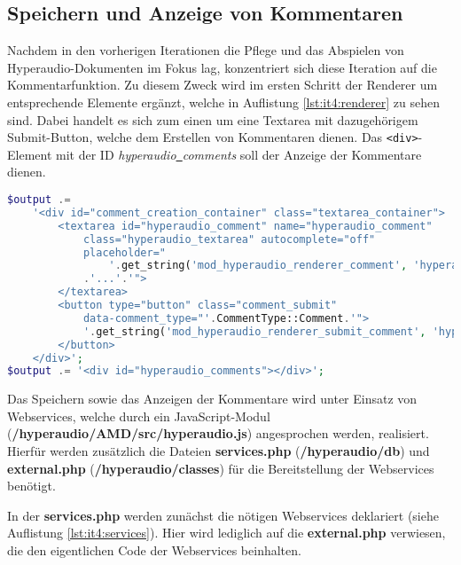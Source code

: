 \subsection{Speichern und Anzeige von Kommentaren}
\label{sub:SpeichernKommentare}
Nachdem in den vorherigen Iterationen die Pflege und das Abspielen von Hyperaudio-Dokumenten im Fokus lag, konzentriert sich diese Iteration auf die Kommentarfunktion. Zu diesem Zweck wird im ersten Schritt der Renderer um entsprechende Elemente ergänzt, welche in Auflistung \ref{lst:it4:renderer} zu sehen sind. Dabei handelt es sich zum einen um eine Textarea mit dazugehörigem Submit-Button, welche dem Erstellen von Kommentaren dienen. Das \texttt{<div>}-Element mit der ID \mbox{\textit{hyperaudio\underline{{ }}comments}} soll der Anzeige der Kommentare dienen.

\begin{lstlisting}[language=php,
             linewidth=\textwidth,
             caption={Ausschnitt der \textbf{renderer.php} in der 4. Iteration},
             label={lst:it4:renderer}]
$output .=
    '<div id="comment_creation_container" class="textarea_container">
        <textarea id="hyperaudio_comment" name="hyperaudio_comment"
            class="hyperaudio_textarea" autocomplete="off"
            placeholder="
                '.get_string('mod_hyperaudio_renderer_comment', 'hyperaudio')
            .'...'.'">
        </textarea>
        <button type="button" class="comment_submit"
            data-comment_type="'.CommentType::Comment.'">
            '.get_string('mod_hyperaudio_renderer_submit_comment', 'hyperaudio').'
        </button>
    </div>';
$output .= '<div id="hyperaudio_comments"></div>';
\end{lstlisting}

Das Speichern sowie das Anzeigen der Kommentare wird unter Einsatz von Webservices, welche durch ein JavaScript-Modul (\textbf{/hyperaudio/AMD/src/hyperaudio.js}) angesprochen werden, realisiert. Hierfür werden zusätzlich die Dateien \textbf{services.php} (\textbf{/hyperaudio/db}) und \textbf{external.php} (\textbf{/hyperaudio/classes}) für die Bereitstellung der Webservices benötigt.

In der \textbf{services.php} werden zunächst die nötigen Webservices deklariert (siehe Auflistung \ref{lst:it4:services}). Hier wird lediglich auf die \textbf{external.php} verwiesen, die den eigentlichen Code der Webservices beinhalten.

